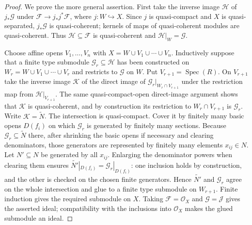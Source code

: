 \begin{proof}
  \leanok
  We prove the more general assertion.  First take the inverse image
  $\mathcal H$ of $j_*\mathcal G$ under
  $\mathcal F\to j_*j^*\mathcal F$, where $j\colon W\hookrightarrow X$.
  Since $j$ is quasi-compact and $X$ is quasi-separated, $j_*\mathcal G$ is
  quasi-coherent; kernels of maps of quasi-coherent modules are
  quasi-coherent.  Thus $\mathcal H\subseteq\mathcal F$ is quasi-coherent and
  $\mathcal H|_W=\mathcal G$.

  Choose affine opens $V_1,\ldots,V_n$ with
  $X=W\cup V_1\cup\cdots\cup V_n$.  Inductively suppose that a finite type
  submodule $\mathcal G_r\subseteq\mathcal H$ has been constructed on
  $W_r=W\cup V_1\cup\cdots\cup V_r$ and restricts to $\mathcal G$ on $W$.
  Put $V_{r+1}=\operatorname{Spec}(R)$.  On $V_{r+1}$ take the inverse image
  $\mathcal K$ of the direct image of
  $\mathcal G_r|_{W_r\cap V_{r+1}}$ under the restriction map from
  $\mathcal H|_{V_{r+1}}$.  The same quasi-compact-open direct-image argument
  shows that $\mathcal K$ is quasi-coherent, and by construction its
  restriction to $W_r\cap V_{r+1}$ is $\mathcal G_r$.  Write
  $\mathcal K=\widetilde N$.  The intersection is quasi-compact.  Cover it by
  finitely many basic opens $D(f_i)$ on which $\mathcal G_r$ is generated by
  finitely many sections.  Because $\mathcal G_r\subseteq\widetilde N$ there,
  after shrinking the basic opens if necessary and clearing denominators, those
  generators are represented by finitely many elements $x_{ij}\in N$.  Let
  $N'\subseteq N$ be generated by all $x_{ij}$.  Enlarging the denominator
  powers when clearing them ensures
  $\widetilde{N'}|_{D(f_i)}=\mathcal G_r|_{D(f_i)}$: one inclusion holds by
  construction, and the other is checked on the chosen finite generators.
  Hence $\widetilde{N'}$ and $\mathcal G_r$ agree on the whole intersection and
  glue to a finite type submodule on $W_{r+1}$.  Finite induction gives the
  required submodule on $X$.  Taking $\mathcal F=\mathcal O_X$ and
  $\mathcal G=\mathcal J$ gives the asserted ideal; compatibility with the
  inclusions into $\mathcal O_X$ makes the glued submodule an ideal.
\end{proof}

